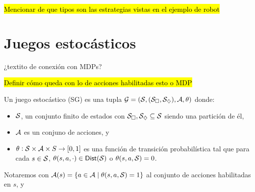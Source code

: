 \hl{Mencionar de que tipos son las estrategias vistas en el ejemplo de robot}







\section{Juegos estocásticos}

¿textito de conexión con MDPs?

\hl{Definir cómo queda con lo de acciones habilitadas esto o MDP}
\begin{definition}
	Un juego estocástico (SG) es una tupla $\mathcal{G} = (\mathcal{S}, (\mathcal{S}_\square, \mathcal{S}_\diamondsuit), \mathcal{A}, \theta)$ donde:
	\begin{itemize}
		\item $\mathcal{S}$, un conjunto finito de estados con $\mathcal{S}_\square, \mathcal{S}_\diamondsuit \subseteq \mathcal{S}$ siendo una partición de él,
		\item $\mathcal{A}$ es un conjuno de acciones, y
		\item $\theta : \mathcal{S} \times \mathcal{A} \times S \rightarrow [0,1]$ es una función de transición probabilística tal que para cada $s \in \mathcal{S}$, $\theta(s, a, \cdot) \in \mathsf{Dist}(\mathcal{S})$ o  $\theta(s, a, \mathcal{S}) = 0$.
	\end{itemize}
	Notaremos con $\mathcal{A}(s) = \{a \in \mathcal{A} \mid \theta(s,a,\mathcal{S}) = 1\}$ al conjunto de acciones habilitadas en $s$, y
\end{definition}

